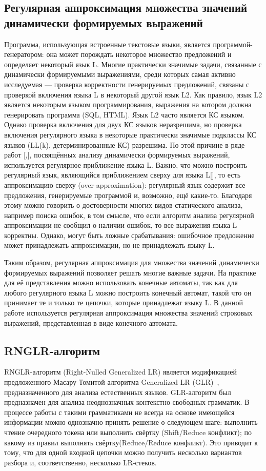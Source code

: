 \subsection{Регулярная аппроксимация множества значений динамически формируемых выражений}
Программа, использующая встроенные текстовые языки, является программой-генератором: она может порождать некоторое множество предложений и определяет некоторый язык L. 
Многие практически значимые задачи, связанные с динамически формируемыми выражениями, среди которых самая активно исследуемая — проверка корректности генерируемых предложений, связаны с 
проверкой включения языка L в некоторый другой язык L2. Как правило, язык L2 является некоторым языком программирования, выражения на котором должна генерировать программа (SQL, HTML). 
Язык L2 часто является КС языком. Однако проверка включения для двух КС языков неразрешима, но проверка включения регулярного языка в некоторые практически значимые подклассы КС языков (LL(k), 
детерминированные КС) разрешима. По этой причине в ряде работ [,], посвящённых анализу динамически формируемых выражений, используется регулярное приближение языка L. Важно, что можно построить 
регулярный язык, являющийся приближением сверху для языка L[], то есть аппроксимацию сверху (over-approximation): регулярный язык содержит все предложения, генерируемые программой и, возможно, ещё какие-то. 
Благодаря этому можно говорить о достоверности многих видов статического анализа, например поиска ошибок, в том смысле, что если алгоритм анализа регулярной аппроксимации не сообщил о наличии ошибок, 
то все выражения языка L корректны. Однако, могут быть ложные срабатывания: ошибочное предложение может принадлежать аппроксимации, но не принадлежать языку L.

Таким образом, регулярная аппроксимация для множества значений динамически формируемых выражений позволяет решать многие важные задачи. На практике для её представления можно использовать конечные автоматы, 
так как для любого регулярного языка L можно построить конечный автомат, такой что он принимает те и только те цепочки, которые принадлежат языку L. В данной работе используется регулярная аппроксимация 
множества значений строковых выражений, представленная в виде конечного автомата.

\subsection{RNGLR-алгоритм}
RNGLR-алгоритм (Right-Nulled Generalized LR) является модификацией предложенного Масару Томитой алгоритма Generalized LR (GLR)~\cite{Tomita}, предназначенного для анализа естественных языков. 
GLR-алгоритм был предназначен для анализа неоднозначных контекстно-свободных грамматик. В процессе работы с такими грамматиками не всегда на основе имеющейся информации можно однозначно принять решение 
о следующем шаге: выполнить чтение очередного токена или выполнить свёртку (Shift/Reduce конфликт); по какому из правил выполнять свёртку(Reduce/Reduce конфликт). Это приводит к тому, что для одной 
входной цепочки можно получить несколько вариантов разбора и, соответственно, несколько LR-стеков.  

